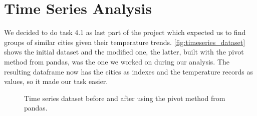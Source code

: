 \section{Time Series Analysis}
We decided to do task 4.1 as last part of the project which expected us to find groups of similar cities given their temperature trends.
\autoref{fig:timeseries_dataset} shows the initial dataset and the modified one, the latter, built with the pivot method from pandas, was the one we worked on during our analysis. The resulting dataframe now has the cities as indexes and the temperature records as values, so it made our task easier.

\begin{figure}[H]
    \centering
    \caption{Time series dataset before and after using the pivot method from pandas.}
    \label{fig:timeseries_dataset}
\end{figure}

